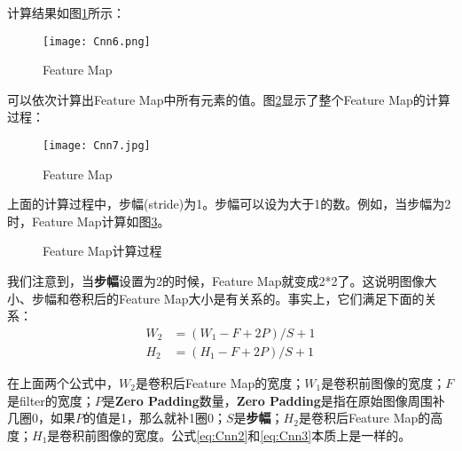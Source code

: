 计算结果如图\ref{fig:Cnn6}所示：

\begin{figure}[h]
	\centering
	\texttt{[image: Cnn6.png]}
	\caption{Feature Map}
	\label{fig:Cnn6}
\end{figure}

可以依次计算出Feature Map中所有元素的值。图\ref{fig:Cnn7}显示了整个Feature Map的计算过程：

\begin{figure}[h]
	\centering
	\texttt{[image: Cnn7.jpg]}
	\caption{Feature Map}
	\label{fig:Cnn7}
\end{figure}

上面的计算过程中，步幅(stride)为1。步幅可以设为大于1的数。例如，当步幅为2时，Feature Map计算如图\ref{fig:Cnn8}。


\begin{figure}[!h]
	\centering



	\centering
	\caption{Feature Map计算过程}
	\label{fig:Cnn8}
\end{figure}



我们注意到，当\textbf{步幅}设置为2的时候，Feature Map就变成2*2了。这说明图像大小、步幅和卷积后的Feature Map大小是有关系的。事实上，它们满足下面的关系：
\begin{align}
	W_2 & = (W_1 - F + 2P)/S + 1\label{eq:Cnn2} \\
	H_2 & = (H_1 - F + 2P)/S + 1\label{eq:Cnn3}
\end{align}


在上面两个公式中，\(W_2\)是卷积后Feature Map的宽度；\(W_1\)是卷积前图像的宽度；\(F\)是filter的宽度；\(P\)是\textbf{Zero Padding}数量，\textbf{Zero Padding}是指在原始图像周围补几圈0，如果\(P\)的值是1，那么就补1圈0；\(S\)是\textbf{步幅}；\(H_2\)是卷积后Feature Map的高度；\(H_1\)是卷积前图像的宽度。公式\ref{eq:Cnn2}和\ref{eq:Cnn3}本质上是一样的。

